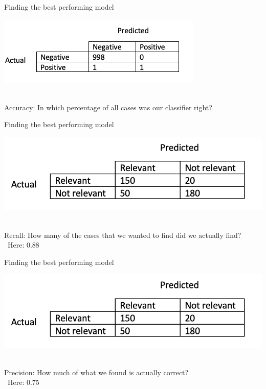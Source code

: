 \documentclass[handout]{beamer}
\begin{document}
\begin{frame}{Finding the best performing model}

\begin{center}
	\includegraphics[width=\linewidth,height=\textheight,keepaspectratio]{../pictures/ConfusionMatrix1.png} \\\
\end{center}

Accuracy: In which percentage of all cases was our classifier right? 

\end{frame}



\begin{frame}{Finding the best performing model}
\begin{center}
	\includegraphics[width=\linewidth,height=\textheight,keepaspectratio]{../pictures/ConfusionMatrix2.png} \\\
\end{center}
	
Recall: How many of the cases that we wanted to find did we actually find? \\\
Here: 0.88

	
\end{frame}



\begin{frame}{Finding the best performing model}
	\begin{center}
		\includegraphics[width=\linewidth,height=\textheight,keepaspectratio]{../pictures/ConfusionMatrix2.png} \\\
	\end{center}
	
	Precision:  How much of what we found is actually correct? \\\
	Here: 0.75

	
\end{frame}
\end{document}
